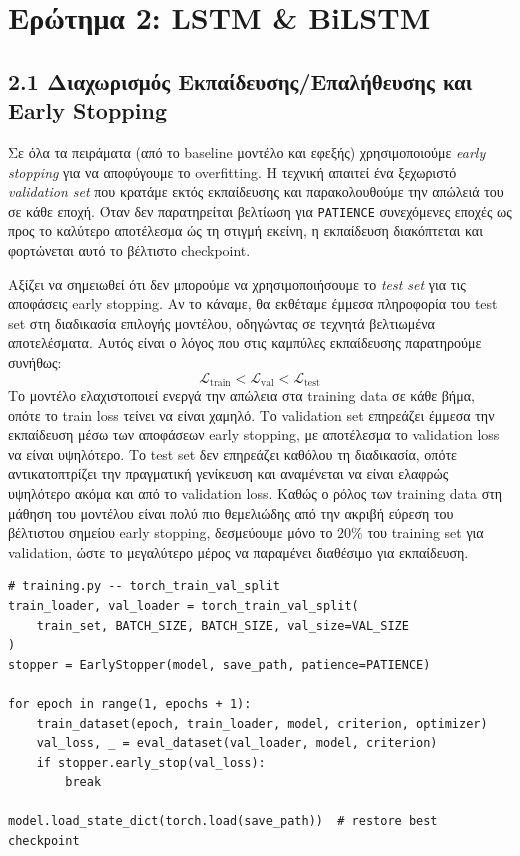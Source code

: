 \documentclass[12pt]{article}
\begin{document}
\section{Ερώτημα 2: LSTM \& BiLSTM}

\subsection{2.1 Διαχωρισμός Εκπαίδευσης/Επαλήθευσης και Early Stopping}

Σε όλα τα πειράματα (από το baseline μοντέλο και εφεξής) χρησιμοποιούμε
\emph{early stopping} για να αποφύγουμε το overfitting. Η τεχνική απαιτεί
ένα ξεχωριστό \emph{validation set} που κρατάμε εκτός εκπαίδευσης και
παρακολουθούμε την απώλειά του σε κάθε εποχή. Όταν δεν παρατηρείται
βελτίωση για \texttt{PATIENCE} συνεχόμενες εποχές ως προς το καλύτερο
αποτέλεσμα ώς τη στιγμή εκείνη, η εκπαίδευση διακόπτεται και φορτώνεται
αυτό το βέλτιστο checkpoint.

Αξίζει να σημειωθεί ότι δεν μπορούμε να χρησιμοποιήσουμε το
\emph{test set} για τις αποφάσεις early stopping. Αν το κάναμε,
θα εκθέταμε έμμεσα πληροφορία του test set στη διαδικασία επιλογής
μοντέλου, οδηγώντας σε τεχνητά βελτιωμένα αποτελέσματα. Αυτός
είναι ο λόγος που στις καμπύλες εκπαίδευσης παρατηρούμε συνήθως:
\[
    \mathcal{L}_{\text{train}} < \mathcal{L}_{\text{val}} < \mathcal{L}_{\text{test}}
\]
Το μοντέλο ελαχιστοποιεί ενεργά την απώλεια στα training data σε
κάθε βήμα, οπότε το train loss τείνει να είναι χαμηλό. Το validation
set επηρεάζει έμμεσα την εκπαίδευση μέσω των αποφάσεων early stopping,
με αποτέλεσμα το validation loss να είναι υψηλότερο. Το test set δεν
επηρεάζει καθόλου τη διαδικασία, οπότε αντικατοπτρίζει την πραγματική
γενίκευση και αναμένεται να είναι ελαφρώς υψηλότερο ακόμα και από το
validation loss. Καθώς ο ρόλος των training data στη μάθηση του μοντέλου είναι πολύ
πιο θεμελιώδης από την ακριβή εύρεση του βέλτιστου σημείου early
stopping, δεσμεύουμε μόνο το $20\%$ του training set για validation,
ώστε το μεγαλύτερο μέρος να παραμένει διαθέσιμο για εκπαίδευση.

\begin{lstlisting}
# training.py -- torch_train_val_split
train_loader, val_loader = torch_train_val_split(
    train_set, BATCH_SIZE, BATCH_SIZE, val_size=VAL_SIZE
)
stopper = EarlyStopper(model, save_path, patience=PATIENCE)

for epoch in range(1, epochs + 1):
    train_dataset(epoch, train_loader, model, criterion, optimizer)
    val_loss, _ = eval_dataset(val_loader, model, criterion)
    if stopper.early_stop(val_loss):
        break

model.load_state_dict(torch.load(save_path))  # restore best checkpoint
\end{lstlisting}
\end{document}
